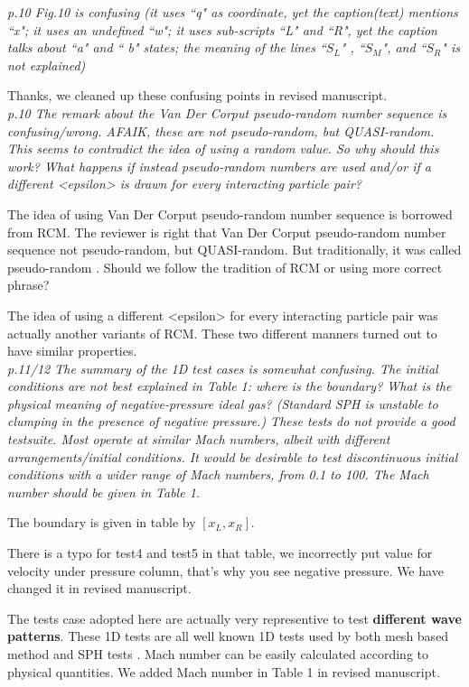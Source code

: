 \documentclass[10pt,a4paper]{article}
\begin{document}
\textit{p.10 Fig.10 is confusing (it uses ``q" as coordinate, yet the caption(text) mentions ``x"; it uses an undefined ``w"; it uses sub-scripts ``L" and ``R", yet the caption talks about ``a" and `` b" states; the meaning of the lines ``$S_L$" , ``$S_M$", and ``$S_R$" is not explained)}

Thanks, we cleaned up these confusing points in revised manuscript.
\\[3pt]

\textit{p.10 The remark about the Van Der Corput pseudo-random number sequence is confusing/wrong. AFAIK, these are not pseudo-random, but QUASI-random. This seems to contradict the idea of using a random value. So why should this work?
What happens if instead pseudo-random numbers are used and/or if a different <epsilon> is drawn for every interacting particle pair?}

The idea of using Van Der Corput pseudo-random number sequence is borrowed from RCM. The reviewer is right that Van Der Corput pseudo-random number sequence not pseudo-random, but QUASI-random. But traditionally, it was called pseudo-random \citep[][e.g.]{toro2013riemann}. Should we follow the tradition of RCM or using more correct phrase? 

The idea of using a different <epsilon> for every interacting particle pair was actually another variants of RCM. These two different manners turned out to have similar properties. 
\\[3pt]

\textit{p.11/12 The summary of the 1D test cases is somewhat confusing. The initial conditions are not best explained in Table 1: where is the boundary? What is the physical meaning of negative-pressure ideal gas? (Standard SPH is unstable to clumping in the presence of negative pressure.)
These tests do not provide a good testsuite. Most operate at similar Mach numbers, albeit with different arrangements/initial conditions. It would
be desirable to test discontinuous initial conditions with a wider range of Mach numbers, from 0.1 to 100. The Mach number should be given in Table 1.}

The boundary is given in table by $[x_L, x_R]$.

There is a typo for test4 and test5 in that table, we incorrectly put value for velocity under pressure column, that's why you see negative pressure. We have changed it in revised manuscript.

The tests case adopted here are actually very representive to test \textbf{different wave patterns}. These 1D tests are all well known 1D tests used by both mesh based method \citep[][e.g.]{toro2013riemann, leveque2002finite} and SPH tests \citep[][e.g.]{monaghan1983shock, cha2003implementations, puri2014approximate}. 
Mach number can be easily calculated according to physical quantities. We added Mach number in Table 1 in revised manuscript. 
\\[3pt]
\end{document}
